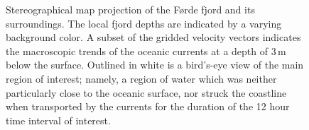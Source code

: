 \begin{figure}[htpb]
    \centering
    \caption[Stereographical map projection of the Førde fjord and its
    surroundings]
    {Stereographical map projection of the Førde fjord and its surroundings.
        The local fjord depths are indicated by a varying background color. A
        subset of the gridded velocity vectors indicates the macroscopic trends
        of the oceanic currents at a depth of $3\,\si{\meter}$ below the
        surface. Outlined in white is a bird's-eye view of the main region of
        interest; namely, a region of water which was neither particularly
        close to the oceanic surface, nor struck the coastline when transported
        by the currents for the duration of the 12 hour time interval of
        interest.
    }
    \label{fig:currentmap}
\end{figure}

